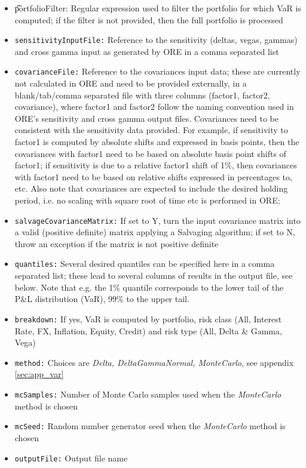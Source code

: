 \documentclass[12pt, a4paper]{article}
\begin{document}
\begin{itemize}
\item {\t portfolioFilter:} Regular expression used to filter the portfolio for which VaR is computed; if the filter is not provided, then the full portfolio is processed
\item {\tt sensitivityInputFile:} Reference to the sensitivity (deltas, vegas, gammas) and cross gamma input as generated by ORE in a comma separated list
\item {\tt covarianceFile:} Reference to the covariances input data; these are currently not calculated in ORE and need to be provided externally, in a blank/tab/comma separated file with three columns (factor1, factor2, covariance), where factor1 and factor2 follow the naming convention used in ORE's sensitivity and cross gamma output files. Covariances need to be consistent with the sensitivity data provided. For example, if sensitivity to factor1 is computed by absolute shifts and expressed in basis points, then the covariances with factor1 need to be based on absolute basis point shifts of factor1; if sensitivity is due to a relative factor1 shift of 1\%, then covariances with factor1 need to be based on relative shifts expressed in percentages to, etc. Also note that covariances are expected to include the desired holding period, i.e. no scaling with square root of time etc is performed in ORE; 
\item {\tt salvageCovarianceMatrix:} If set to Y, turn the input covariance matrix into a valid (positive definite) matrix applying a Salvaging algorithm; if set to N, throw an exception if the matrix is not positive definite
\item {\tt quantiles:} Several desired quantiles can be specified here in a comma separated list; these lead to several columns of results in the output file, see below. Note that e.g. the 1\% quantile corresponds to the lower tail of the P\&L distribution (VaR), 99\% to the upper tail.
\item {\tt breakdown:} If yes, VaR is computed by portfolio, risk class (All, Interest Rate, FX, Inflation, Equity, Credit) and risk type (All, Delta \& Gamma, Vega)
\item {\tt method:} Choices are {\em Delta, DeltaGammaNormal, MonteCarlo}, see appendix \ref{sec:app_var}
\item {\tt mcSamples:} Number of Monte Carlo samples used when the {\em MonteCarlo} method is chosen 
\item {\tt mcSeed:} Random number generator seed when the {\em MonteCarlo} method is chosen
\item {\tt outputFile:} Output file name
\end{itemize}
\end{document}
